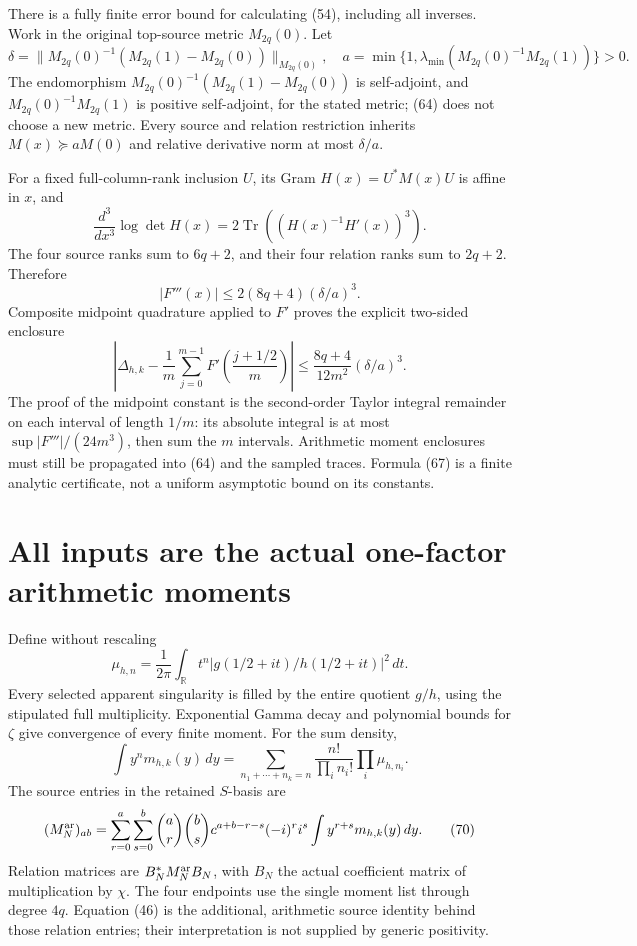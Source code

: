 \documentclass[11pt]{article}
\begin{document}
There is a fully finite error bound for calculating (54), including all inverses. Work in the original top-source metric $M_{2q}(0)$. Let
\[
 \delta=\|M_{2q}(0)^{-1}(M_{2q}(1)-M_{2q}(0))\|_{M_{2q}(0)},
 \quad a=\min\{1,\lambda_{\min}(M_{2q}(0)^{-1}M_{2q}(1))\}>0.
 \tag{64}
\]
The endomorphism $M_{2q}(0)^{-1}(M_{2q}(1)-M_{2q}(0))$ is self-adjoint, and $M_{2q}(0)^{-1}M_{2q}(1)$ is positive self-adjoint, for the stated metric; (64) does not choose a new metric. Every source and relation restriction inherits $M(x)\succeq aM(0)$ and relative derivative norm at most $\delta/a$.

For a fixed full-column-rank inclusion $U$, its Gram $H(x)=U^*M(x)U$ is affine in $x$, and
\[
 \frac{d^3}{dx^3}\log\det H(x)
   =2\operatorname{Tr}((H(x)^{-1}H'(x))^3).
 \tag{65}
\]
The four source ranks sum to $6q+2$, and their four relation ranks sum to $2q+2$. Therefore
\[
 |F'''(x)|\le2(8q+4)(\delta/a)^3.
 \tag{66}
\]
Composite midpoint quadrature applied to $F'$ proves the explicit two-sided enclosure
\[
 \boxed{\left|\Delta_{h,k}
 -\frac1m\sum_{j=0}^{m-1}F'\!\left(\frac{j+1/2}{m}\right)\right|
 \le\frac{8q+4}{12m^2}(\delta/a)^3.}
 \tag{67}
\]
The proof of the midpoint constant is the second-order Taylor integral remainder on each interval of length $1/m$: its absolute integral is at most $\sup|F'''|/(24m^3)$, then sum the $m$ intervals. Arithmetic moment enclosures must still be propagated into (64) and the sampled traces. Formula (67) is a finite analytic certificate, not a uniform asymptotic bound on its constants.

\section{All inputs are the actual one-factor arithmetic moments}
Define without rescaling
\[
 \mu_{h,n}=\frac1{2\pi}\int_{\mathbb R}
       t^n|g(1/2+it)/h(1/2+it)|^2\,dt.
 \tag{68}
\]
Every selected apparent singularity is filled by the entire quotient $g/h$, using the stipulated full multiplicity. Exponential Gamma decay and polynomial bounds for $\zeta$ give convergence of every finite moment. For the sum density,
\[
 \int y^n m_{h,k}(y)\,dy
 =\sum_{n_1+\cdots+n_k=n}
      \frac{n!}{\prod_i n_i!}\prod_i\mu_{h,n_i}.
 \tag{69}
\]
The source entries in the retained $S$-basis are
\[
 (M_N^{\rm ar})_{ab}
 =\sum_{r=0}^a\sum_{s=0}^b
   \binom ar\binom bs c^{a+b-r-s}(-i)^ri^s
                      \int y^{r+s}m_{h,k}(y)\,dy.
 \tag{70}
\]
Relation matrices are $B_N^*M_N^{\rm ar}B_N$, with $B_N$ the actual coefficient matrix of multiplication by $\chi$. The four endpoints use the single moment list through degree $4q$. Equation (46) is the additional, arithmetic source identity behind those relation entries; their interpretation is not supplied by generic positivity.
\end{document}
